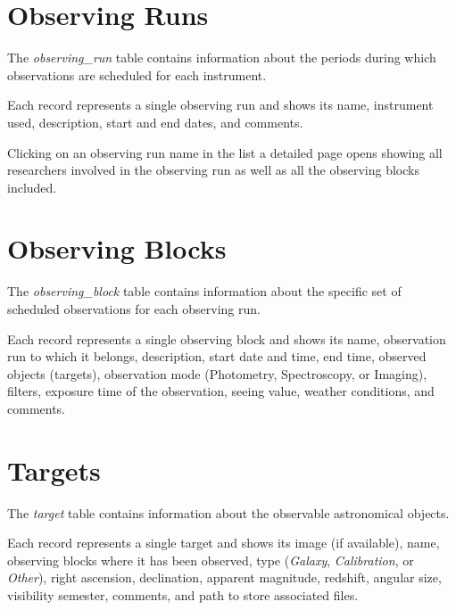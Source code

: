 \section{Observing Runs}

The \textsl{observing\_run} table contains information about the periods during which observations are scheduled for each instrument. 

Each record represents a single observing run and shows its name, instrument used, description, start and end dates, and comments.


Clicking on an observing run name in the list a detailed page opens showing all researchers involved in the observing run as well as all the observing blocks included.


\section{Observing Blocks}

The \textsl{observing\_block} table contains information about the specific set of scheduled observations for each observing run. 

Each record represents a single observing block and shows its name, observation run to which it belongs, description, start date and time, end time, observed objects (targets), observation mode (Photometry, Spectroscopy, or Imaging), filters, exposure time of the observation, seeing value, weather conditions,  and comments.



\section{Targets}

The \textsl{target} table contains information about the observable astronomical objects. 

Each record represents a single target and shows its image (if available), name, observing blocks where it has been observed, type (\textsl{Galaxy}, \textsl{Calibration}, or \textsl{Other}), right ascension, declination, apparent magnitude, redshift, angular size, visibility semester, comments, and path to store associated files.



